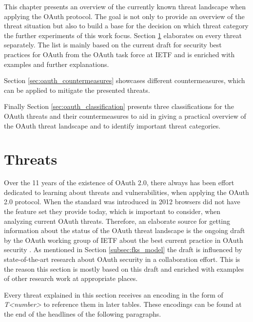 This chapter presents an overview of the currently known threat landscape when applying the OAuth protocol. The goal is not only to provide an overview of the threat situation but also to build a base for the decision on which threat category the further experiments of this work focus. Section \ref{sec:oauth_threats} elaborates on every threat separately. The list is mainly based on the current draft for security best practices for OAuth from the OAuth task force at IETF \cite{lodderstedt2020oauth} and is enriched with examples and further explanations.

Section \ref{sec:oauth_countermeasures} showcases different countermeasures, which can be applied to mitigate the presented threats. 

Finally Section \ref{sec:oauth_classification} presents three classifications for the OAuth threats and their countermeasures to aid in giving a practical overview of the OAuth threat landscape and to identify important threat categories.

\section{Threats}
\label{sec:oauth_threats}
Over the 11 years of the existence of OAuth 2.0, there always has been effort dedicated to learning about threats and vulnerabilities, when applying the OAuth 2.0 protocol. When the standard was introduced in 2012 browsers did not have the feature set they provide today, which is important to consider, when analyzing current OAuth threats. Therefore, an elaborate source for getting information about the status of the OAuth threat landscape is the ongoing draft by the OAuth working group of IETF about the best current practice in OAuth security \cite{lodderstedt2020oauth}. As mentioned in Section \ref{subsec:fks_model} the draft is influenced by state-of-the-art research about OAuth security in a collaboration effort. This is the reason this section is mostly based on this draft and enriched with examples of other research work at appropriate places.

Every threat explained in this section receives an encoding in the form of \emph{T<number>} to reference them in later tables. These encodings can be found at the end of the headlines of the following paragraphs.


